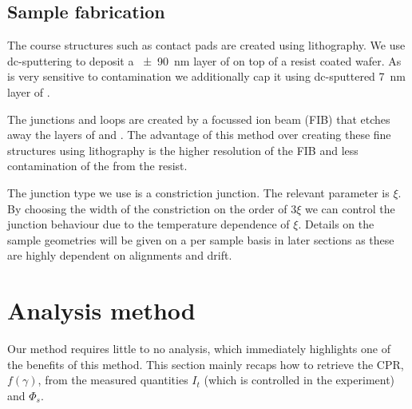 \subsection{Sample fabrication}
\label{sec:method-sample-fabrication}
The course structures such as contact pads are created using lithography. We use dc-sputtering to deposit a \qty{\pm 90}{\nano\meter} layer of  on top of a resist coated  wafer. As  is very sensitive to contamination we additionally cap it using dc-sputtered \qty{7}{\nano\meter} layer of .

The junctions and loops are created by a focussed ion beam (FIB) that etches away the layers of  and . The advantage of this method over creating these fine structures using lithography is the higher resolution of the FIB and less contamination of the  from the resist.

The junction type we use is a constriction junction. The relevant parameter is $\xi$. By choosing the width of the constriction on the order of $3\xi$ we can control the junction behaviour due to the temperature dependence of $\xi$\cite{tinkhamIntroductionSuperconductivity}. Details on the sample geometries will be given on a per sample basis in later sections as these are highly dependent on alignments and drift.

\section{Analysis method}
Our method requires little to no analysis, which immediately highlights one of the benefits of this method. This section mainly recaps how to retrieve the CPR, $f(\gamma)$, from the measured quantities $I_t$ (which is controlled in the experiment) and $\Phi_s$.

